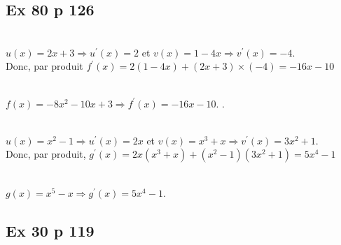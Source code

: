 \documentclass[12pt,a5paper]{book}
\begin{document}
\subsection*{Ex 80 p 126}
\begin{enumMet}
    \item 
    \begin{enumMet}
        \item {}\\
        $u(x)=2 x+3 \Rightarrow u^{\prime}(x)=2$ et $v(x)=1-4 x \Rightarrow v^{\prime}(x)=-4$.\\
Donc, par produit $f^{\prime}(x)=2(1-4 x)+(2 x+3) \times(-4)=-16 x-10$

        \item {}\\
        $f(x)=-8 x^{2}-10 x+3 \Rightarrow f^{\prime}(x)=-16 x-10$. .
    \end{enumMet}
    \item
    \begin{enumMet}
        \item {}\\
        $u(x)=x^{2}-1 \Rightarrow u^{\prime}(x)=2 x$ et
$v(x)=x^{3}+x \Rightarrow v^{\prime}(x)=3 x^{2}+1$.\\
Donc, par produit, $g^{\prime}(x)=2 x\left(x^{3}+x\right)+\left(x^{2}-1\right)\left(3 x^{2}+1\right)=5 x^{4}-1$
        \item {}\\
        $g(x)=x^{5}-x \Rightarrow g^{\prime}(x)=5 x^{4}-1$.
    \end{enumMet}
\end{enumMet}

\subsection*{Ex 30 p 119}
\end{document}
